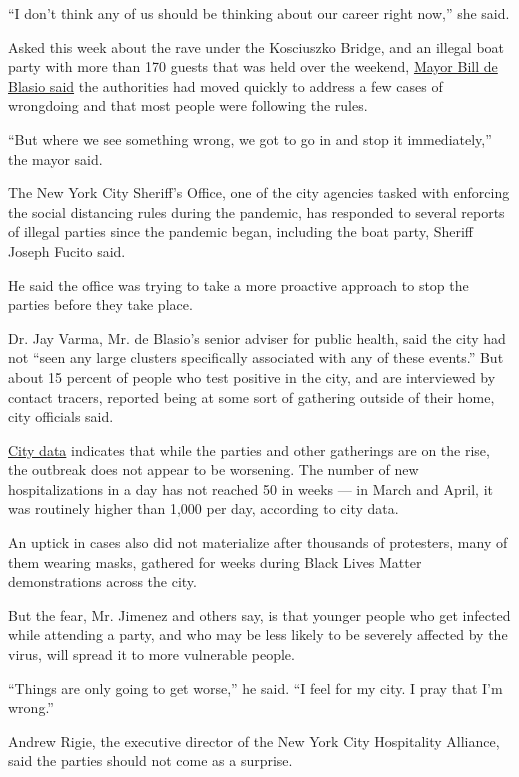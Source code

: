 ``I don't think any of us should be thinking about our career right
now,'' she said.

Asked this week about the rave under the Kosciuszko Bridge, and an
illegal boat party with more than 170 guests that was held over the
weekend, \href{https://www.youtube.com/watch?v=SaaJUcexvog}{Mayor Bill
de Blasio said} the authorities had moved quickly to address a few cases
of wrongdoing and that most people were following the rules.

``But where we see something wrong, we got to go in and stop it
immediately,'' the mayor said.

The New York City Sheriff's Office, one of the city agencies tasked with
enforcing the social distancing rules during the pandemic, has responded
to several reports of illegal parties since the pandemic began,
including the boat party, Sheriff Joseph Fucito said.

He said the office was trying to take a more proactive approach to stop
the parties before they take place.

Dr. Jay Varma, Mr. de Blasio's senior adviser for public health, said
the city had not ``seen any large clusters specifically associated with
any of these events.'' But about 15 percent of people who test positive
in the city, and are interviewed by contact tracers, reported being at
some sort of gathering outside of their home, city officials said.

\href{https://www1.nyc.gov/site/doh/covid/covid-19-data.page}{City data}
indicates that while the parties and other gatherings are on the rise,
the outbreak does not appear to be worsening. The number of new
hospitalizations in a day has not reached 50 in weeks --- in March and
April, it was routinely higher than 1,000 per day, according to city
data.

An uptick in cases also did not materialize after thousands of
protesters, many of them wearing masks, gathered for weeks during Black
Lives Matter demonstrations across the city.

But the fear, Mr. Jimenez and others say, is that younger people who get
infected while attending a party, and who may be less likely to be
severely affected by the virus, will spread it to more vulnerable
people.

``Things are only going to get worse,'' he said. ``I feel for my city. I
pray that I'm wrong.''

Andrew Rigie, the executive director of the New York City Hospitality
Alliance, said the parties should not come as a surprise.

